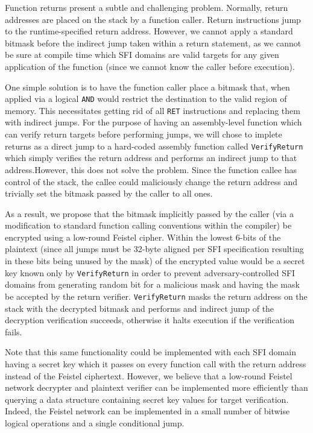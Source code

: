 \documentclass[12pt]{article}
\begin{document}
Function returns present a subtle and challenging problem. Normally, return addresses are placed on the stack by a function caller. Return instructions jump to the runtime-specified return address. However, we cannot apply a standard bitmask before the indirect jump taken within a return statement, as we cannot be sure at compile time which SFI domains are valid targets for any given application of the function (since we cannot know the caller before execution).

One simple solution is to have the function caller place a bitmask that, when applied via a logical \texttt{AND} would restrict the destination to the valid region of memory. This necessitates getting rid of all \texttt{RET} instructions and replacing them with indirect jumps. For the purpose of having an assembly-level function which can verify return targets before performing jumps, we will chose to implete returns as a direct jump to a hard-coded assembly function called \texttt{VerifyReturn} which simply verifies the return address and performs an indirect jump to that address.However, this does not solve the problem. Since the function callee has control of the stack, the callee could maliciously change the return address and trivially set the bitmask passed by the caller to all ones.

As a result, we propose that the bitmask implicitly passed by the caller (via a modification to standard function calling conventions within the compiler) be encrypted using a low-round Feistel cipher. Within the lowest 6-bits of the plaintext (since all jumps must be 32-byte aligned per SFI specification resulting in these bits being unused by the mask) of the encrypted value would be a secret key known only by \texttt{VerifyReturn} in order to prevent adversary-controlled SFI domains from generating random bit for a malicious mask and having the mask be accepted by the return verifier. \texttt{VerifyReturn} masks the return address on the stack with the decrypted bitmask and performs and indirect jump of the decryption verification succeeds, otherwise it halts execution if the verification fails.

Note that this same functionality could be implemented with each SFI domain having a secret key which it passes on every function call with the return address instead of the Feistel ciphertext. However, we believe that a low-round Feistel network decrypter and plaintext verifier can be implemented more efficiently than querying a data structure containing secret key values for target verification. Indeed, the Feistel network can be implemented in a small number of bitwise logical operations and a single conditional jump.

 
\end{document}
